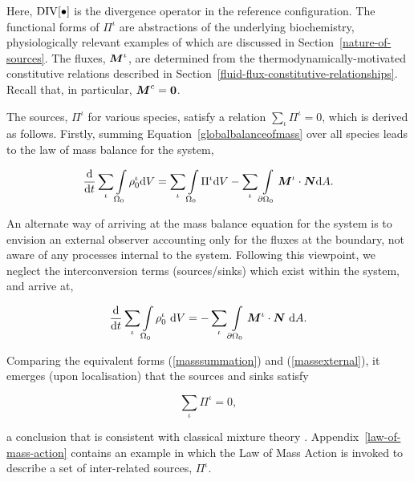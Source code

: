 \noindent Here, $\mathrm{\small{DIV}[\bullet]}$ is the divergence
operator in the reference configuration. The functional forms of
$\Pi^\iota$ are abstractions of the underlying biochemistry,
physiologically relevant examples of which are discussed in
Section~\ref{nature-of-sources}. The fluxes, $\mbox{\boldmath$ M$}^\iota$, are
determined from the thermodynamically-motivated constitutive relations
described in
Section~\ref{fluid-flux-constitutive-relationships}. Recall that, in
particular, $\mbox{\boldmath$ M$}^{c} = {\bf 0}$.

The sources, $\Pi^\iota$ for various species, satisfy a relation
$\sum\limits_\iota\Pi^\iota = 0$, which is derived as
follows. Firstly, summing Equation~\ref{globalbalanceofmass} over all
species leads to the law of mass balance for the system,

\begin{equation}
\frac{\mathrm{d}}{\mathrm{d}t} \sum\limits_\iota\int\limits_{\Omega_0}
\rho_0^\iota \mathrm{d}V = \sum\limits_\iota 
\int\limits_{\Omega_0} \Pi^\iota \mathrm{d}V
- \sum\limits_\iota \int\limits_{\partial\Omega_0}\mbox{\boldmath$ M$}^\iota\cdot\mbox{\boldmath$ N$} \mathrm{d}A.
\label{masssummation}
\end{equation}

\noindent An alternate way of arriving at the mass balance equation
for the system is to envision an external observer accounting only for
the fluxes at the boundary, not aware of any processes internal to the
system. Following this viewpoint, we neglect the interconversion terms
(sources/sinks) which exist within the system, and arrive at,

\begin{equation}
\frac{\mathrm{d}}{\mathrm{d}t}\sum\limits_\iota\int\limits_{\Omega_0}\rho_0^\iota
\ \mathrm{d}V =
-\sum\limits_\iota\int\limits_{\partial\Omega_0}\mbox{\boldmath$ M$}^\iota\cdot\mbox{\boldmath$ N$}
\ \mathrm{d}A.
\label{massexternal}
\end{equation}

\noindent Comparing the equivalent forms (\ref{masssummation})
and (\ref{massexternal}), it emerges (upon localisation) that the
sources and sinks satisfy

\begin{equation}
\sum\limits_\iota\Pi^\iota = 0,
\label{masssummationresult}
\end{equation}

\noindent a conclusion that is consistent with classical mixture
theory \citep{TruesdellNoll:65}. Appendix~\ref{law-of-mass-action}
contains an example in which the Law of Mass Action is invoked to
describe a set of inter-related sources, $\Pi^\iota$.

